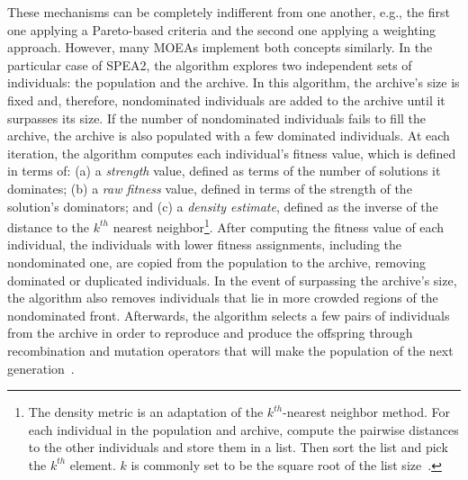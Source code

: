 	These mechanisms can be completely indifferent from one another, e.g., the first one applying a Pareto-based criteria and the second one applying a weighting approach. However, many \acp{MOEA} implement both concepts similarly. In the particular case of \ac{SPEA2}, the algorithm explores two independent sets of individuals: the population and the archive. In this algorithm, the archive's size is fixed and, therefore, nondominated individuals are added to the archive until it surpasses its size. If the number of nondominated individuals fails to fill the archive, the archive is also populated with a few dominated individuals. At each iteration, the algorithm computes each individual's fitness value, which is defined in terms of: (a) a \textit{strength} value, defined as terms of the number of solutions it dominates; (b) a \textit{raw fitness} value, defined in terms of the strength of the solution's dominators; and (c) a \textit{density estimate}, defined as the inverse of the distance to the $k^{th}$ nearest neighbor\footnote{The density metric is an adaptation of the $k^{th}$-nearest neighbor method. For each individual in the population and archive, compute the pairwise distances to the other individuals and store them in a list. Then sort the list and pick the $k^{th}$ element. $k$ is commonly set to be the square root of the list size~\cite{Zitzler2001SPEA2}.}. After computing the fitness value of each individual, the individuals with lower fitness assignments, including the nondominated one, are copied from the population to the archive, removing dominated or duplicated individuals. In the event of surpassing the archive's size, the algorithm also removes individuals that lie in more crowded regions of the nondominated front. Afterwards, the algorithm selects a few pairs of individuals from the archive in order to reproduce and produce the offspring through recombination and mutation operators that will make the population of the next generation~\cite{Zitzler2001SPEA2}.
	
